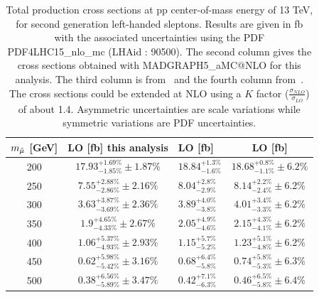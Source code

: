 \documentclass{cernatlasnote}
\begin{document}
\begin{table}
    \centering
    \begin{tabular}{ | c || c | m{6em} | c |}
        \hline
        \rowcolor{lightgray} 
         $m_{\Tilde{\mu}}$ [GeV]  & LO [fb] this analysis & LO [fb] \cite{Fuks_2014}& LO [fb] \cite{Fiaschi_2018}\\
         \hline
         \hline
         200 & $17.93^{+1.69\%}_{-1.85\%} \pm 1.87\%$  & $18.84^{+1.3\%}_{-1.6\%}$ & $18.68^{+0.8\%}_{-1.1\%} \pm 6.2\%$ \\
         \hline
         250  & $7.55^{+2.88\%}_{-2.86\%} \pm 2.16\% $   & $8.04^{+2.8\%}_{-2.9\%}$  & $8.14^{+2.2\%}_{-2.4\%} \pm 6.2\%$  \\
         \hline
         300  & $3.63^{+3.87\%}_{-3.69\%} \pm 2.36\%$ & $3.89^{+4.0\%}_{-3.8\%}$  & $4.01^{+3.4\%}_{-3.3\%} \pm 6.2\%$ \\
         \hline
         350  & $1.9^{+4.65\%}_{-4.33\%} \pm 2.67\%$  & $2.05^{+4.9\%}_{-4.6\%}$  & $2.15^{+4.3\%}_{-4.1\%} \pm 6.2\%$ \\
         \hline
         400   & $1.06^{+5.37\%}_{-4.93\%} \pm 2.93\%$ & $1.15^{+5.7\%}_{-5.2\%}$   & $1.23^{+5.1\%}_{-4.8\%} \pm 6.2\%$ \\
         \hline
         450   & $0.62^{+5.98\%}_{-5.42\%} \pm 3.16\%$   & $0.68^{+6.4\%}_{-5.8\%}$  & $0.74^{+5.8\%}_{-5.3\%} \pm 6.3\%$ \\
         \hline
         500  & $0.38^{+6.56\%}_{-5.89\%} \pm 3.47\%$   & $0.42^{+7.1\%}_{-6.3\%}$  & $0.46^{+6.5\%}_{-5.8\%} \pm 6.4\%$ \\
         \hline
    \end{tabular}
    \caption{Total production cross sections at pp center-of-mass  energy of 13 TeV, for second generation left-handed sleptons. Results are given in fb with the associated uncertainties using the PDF PDF4LHC15\_nlo\_mc (LHAid : 90500). The second column gives the cross sections obtained with MADGRAPH5\_aMC@NLO for this analysis. The third column is from~\cite{Fuks_2014} and the fourth column from~\cite{Fiaschi_2018}. The cross sections could be extended at NLO using a $K$ factor ($\frac{\sigma_{NLO}}{\sigma_{LO}}$) of about 1.4. Asymmetric uncertainties are scale variations while symmetric variations are PDF uncertainties.} 
    \label{tab:LEFTXS}
\end{table}
\end{document}
